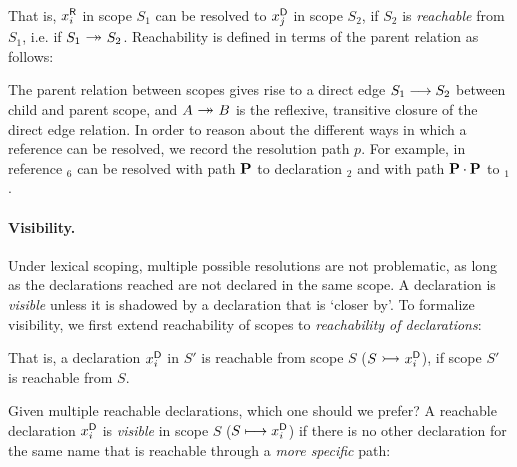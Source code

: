 \begin{center}
\end{center}
	
\noindent
That is, ${x}^{\mbox{\scriptsize\sf R}}_{i}$ in scope $S_1$ can be resolved to ${x}^{\mbox{\scriptsize\sf D}}_{j}$ in scope $S_2$, if
$S_2$ is \emph{reachable} from $S_1$, i.e. if $S_1 \medge S_2$.
Reachability is defined in terms of the parent relation as follows:

\begin{center}	
\end{center}

\noindent The parent relation between scopes gives rise to a direct edge $S_1
\stackrel{}{\longrightarrow} S_2$ between child and parent scope, and $A \medge B$ is the reflexive, transitive
closure of the direct edge relation. 
In order to reason about the different ways in which a reference can be
resolved, we record the resolution path $p$. 
For example, in  reference $_6$ can be resolved with
path $\mbox{\rm\bf{P}}$ to declaration $_2$ and with path
$\mbox{\rm\bf{P}}\cdot\mbox{\rm\bf{P}}$ to $_1$.


\paragraph{Visibility.}

Under lexical scoping, multiple possible resolutions are not problematic, as long as
the declarations reached are not declared in the same scope.
A declaration is \emph{visible} unless it is shadowed by a declaration that is
`closer by'.
To formalize visibility, we first extend reachability of scopes to
\emph{reachability of declarations}:


\noindent
That is, a declaration ${x}^{\mbox{\scriptsize\sf D}}_{i}$ in $S'$ is reachable from scope $S$ ($S \reach
\di{x}{i}$), if scope $S'$ is reachable from $S$.

Given multiple reachable declarations, which one should we prefer? A reachable
declaration ${x}^{\mbox{\scriptsize\sf D}}_{i}$ is \emph{visible} in scope $S$ ($S \longmapsto {x}^{\mbox{\scriptsize\sf D}}_{i}$) if
there is no other declaration for the same name that is reachable
through a \emph{more specific} path:

